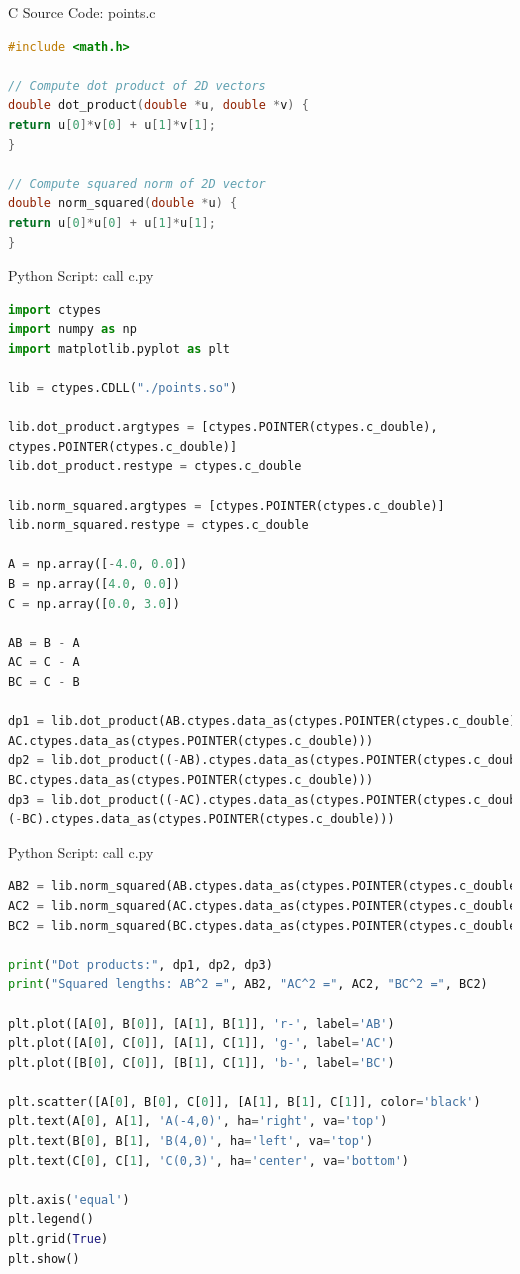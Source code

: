 \documentclass{beamer}
\numberwithin{equation}{section}
\begin{document}
\begin{frame}[fragile]{C Source Code: points.c}
\begin{lstlisting}[language=C]
#include <math.h>

// Compute dot product of 2D vectors
double dot_product(double *u, double *v) {
return u[0]*v[0] + u[1]*v[1];
}

// Compute squared norm of 2D vector
double norm_squared(double *u) {
return u[0]*u[0] + u[1]*u[1];
}
\end{lstlisting}
\end{frame}

\begin{frame}[fragile]{Python Script: call c.py}
\begin{lstlisting}[language=Python]
import ctypes
import numpy as np
import matplotlib.pyplot as plt

lib = ctypes.CDLL("./points.so")

lib.dot_product.argtypes = [ctypes.POINTER(ctypes.c_double),
ctypes.POINTER(ctypes.c_double)]
lib.dot_product.restype = ctypes.c_double

lib.norm_squared.argtypes = [ctypes.POINTER(ctypes.c_double)]
lib.norm_squared.restype = ctypes.c_double

A = np.array([-4.0, 0.0])
B = np.array([4.0, 0.0])
C = np.array([0.0, 3.0])

AB = B - A
AC = C - A
BC = C - B

dp1 = lib.dot_product(AB.ctypes.data_as(ctypes.POINTER(ctypes.c_double)),
AC.ctypes.data_as(ctypes.POINTER(ctypes.c_double)))
dp2 = lib.dot_product((-AB).ctypes.data_as(ctypes.POINTER(ctypes.c_double)),
BC.ctypes.data_as(ctypes.POINTER(ctypes.c_double)))
dp3 = lib.dot_product((-AC).ctypes.data_as(ctypes.POINTER(ctypes.c_double)),
(-BC).ctypes.data_as(ctypes.POINTER(ctypes.c_double)))
\end{lstlisting}
\end{frame}

\begin{frame}[fragile]{Python Script: call c.py}
\begin{lstlisting}[language=Python]
AB2 = lib.norm_squared(AB.ctypes.data_as(ctypes.POINTER(ctypes.c_double)))
AC2 = lib.norm_squared(AC.ctypes.data_as(ctypes.POINTER(ctypes.c_double)))
BC2 = lib.norm_squared(BC.ctypes.data_as(ctypes.POINTER(ctypes.c_double)))

print("Dot products:", dp1, dp2, dp3)
print("Squared lengths: AB^2 =", AB2, "AC^2 =", AC2, "BC^2 =", BC2)

plt.plot([A[0], B[0]], [A[1], B[1]], 'r-', label='AB')
plt.plot([A[0], C[0]], [A[1], C[1]], 'g-', label='AC')
plt.plot([B[0], C[0]], [B[1], C[1]], 'b-', label='BC')

plt.scatter([A[0], B[0], C[0]], [A[1], B[1], C[1]], color='black')
plt.text(A[0], A[1], 'A(-4,0)', ha='right', va='top')
plt.text(B[0], B[1], 'B(4,0)', ha='left', va='top')
plt.text(C[0], C[1], 'C(0,3)', ha='center', va='bottom')

plt.axis('equal')
plt.legend()
plt.grid(True)
plt.show()
\end{lstlisting}
\end{frame}
\end{document}
